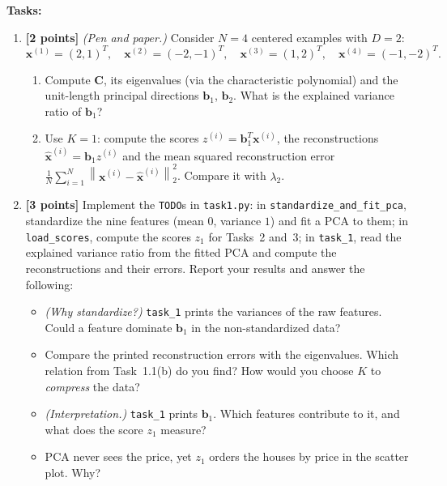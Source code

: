 \documentclass[hidelinks,10pt]{article}
\newcommand\norm[1]{\left\lVert#1\right\rVert}
\providecommand{\xx}{\mathbf{x}}
\providecommand{\bb}{\mathbf{b}}
\providecommand{\CC}{\mathbf{C}}
\begin{document}
\textbf{Tasks:}
\begin{enumerate}
    \item \textbf{[2 points]} \emph{(Pen and paper.)} Consider $N = 4$ centered examples with $D = 2$:
    \begin{equation}
        \xx^{(1)} = (2, 1)^T, \quad \xx^{(2)} = (-2, -1)^T, \quad \xx^{(3)} = (1, 2)^T, \quad \xx^{(4)} = (-1, -2)^T.
    \end{equation}

    \begin{enumerate}[label=(\alph*), itemsep=0.1em, topsep=0.2em]
        \item Compute $\CC$, its eigenvalues (via the characteristic polynomial) and the unit-length principal directions $\bb_1$, $\bb_2$. What is the explained variance ratio of $\bb_1$?
        \item Use $K = 1$: compute the scores $z^{(i)} = \bb_1^T\xx^{(i)}$, the reconstructions $\hat{\xx}^{(i)} = \bb_1 z^{(i)}$ and the mean squared reconstruction error $\frac{1}{N}\sum_{i=1}^{N}\norm{\xx^{(i)} - \hat{\xx}^{(i)}}_2^2$. Compare it with $\lambda_2$.
    \end{enumerate}

    \item \textbf{[3 points]} Implement the \texttt{TODO}s in \texttt{task1.py}: in \texttt{standardize\_and\_fit\_pca}, standardize the nine features (mean $0$, variance $1$) and fit a PCA to them; in \texttt{load\_scores}, compute the scores $z_1$ for Tasks~2 and~3; in \texttt{task\_1}, read the explained variance ratio from the fitted PCA and compute the reconstructions and their errors. Report your results and answer the following:
    \begin{itemize}
        \item[\textbf{Q1.1}] \emph{(Why standardize?)} \texttt{task\_1} prints the variances of the raw features. Could a feature dominate $\bb_1$ in the non-standardized data? 
        \item[\textbf{Q1.2}] Compare the printed reconstruction errors with the eigenvalues. Which relation from Task~1.1(b) do you find? How would you choose $K$ to \emph{compress} the data?
        \item[\textbf{Q1.3}] \emph{(Interpretation.)} \texttt{task\_1} prints $\bb_1$. Which features contribute to it, and what does the score $z_1$ measure?
        \item[\textbf{Q1.4}] PCA never sees the price, yet $z_1$ orders the houses by price in the scatter plot. Why? 
    \end{itemize}
\end{enumerate}
\end{document}
